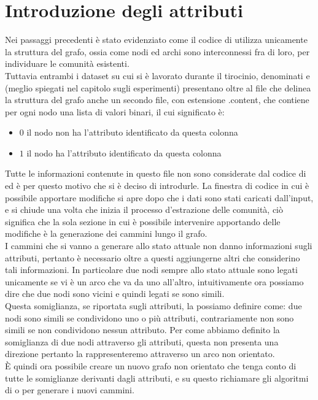 \section{Introduzione degli attributi}
Nei passaggi precedenti è stato evidenziato come il codice di \cnrl utilizza unicamente la struttura del grafo, ossia come nodi ed archi sono interconnessi fra di loro, per individuare le comunità esistenti.\\
Tuttavia entrambi i dataset su cui si è lavorato durante il tirocinio, denominati \cora e \citeseer (meglio spiegati nel capitolo sugli esperimenti) presentano oltre al file che delinea la struttura del grafo anche un secondo file, con estensione .content, che contiene per ogni nodo una lista di valori binari, il cui significato è:
\begin{itemize}
	\item $0$ il nodo non ha l'attributo identificato da questa colonna
	\item $1$ il nodo ha l'attributo identificato da questa colonna
\end{itemize}
%
Tutte le informazioni contenute in questo file non sono considerate dal codice di \cnrl ed è per questo motivo che si è deciso di introdurle. La finestra di codice in cui è possibile apportare modifiche si apre dopo che i dati sono stati caricati dall'input, e si chiude una volta che inizia il processo d'estrazione delle comunità, ciò significa che la sola sezione in cui è possibile intervenire apportando delle modifiche è la generazione dei cammini lungo il grafo.\\
I cammini che si vanno a generare allo stato attuale non danno informazioni sugli attributi, pertanto è necessario oltre a questi aggiungerne altri che considerino tali informazioni. In particolare due nodi sempre allo stato attuale sono legati unicamente se vi è un arco che va da uno 
all'altro, intuitivamente ora possiamo dire che due nodi sono vicini e quindi legati se sono simili.\\
Questa somiglianza, se riportata sugli attributi, la possiamo definire come: due nodi sono simili se condividono uno o più attributi, contrariamente non sono simili se non condividono nessun attributo. Per come abbiamo definito la somiglianza di due nodi attraverso gli attributi, questa non presenta una direzione pertanto la rappresenteremo attraverso un arco non orientato.\\
È quindi ora possibile creare un nuovo grafo non orientato che tenga conto di tutte le somiglianze derivanti dagli attributi, e su questo richiamare gli algoritmi di \nv o \wv per generare i nuovi cammini.
%
